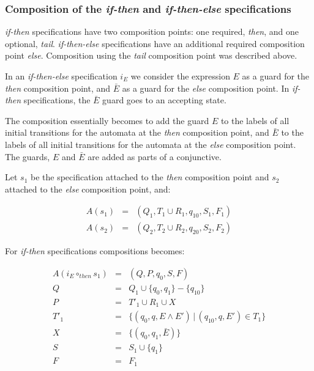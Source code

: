 \subsubsection{Composition of the \textit{if-then} and \textit{if-then-else}
specifications}

\textit{if-then} specifications have two composition points: one required,
\textit{then}, and one optional, \textit{tail}. \textit{if-then-else}
specifications have an additional required composition point \textit{else}.
Composition using the \textit{tail} composition point was described above.

In an \textit{if-then-else} specification $i_E$ we consider the expression $E$
as a guard for the \textit{then} composition point, and $\bar{E}$ as a guard
for the \textit{else} composition point. In \textit{if-then} specifications,
the $\bar{E}$ guard goes to an accepting state.

The composition essentially becomes to add the guard $E$ to the labels of all
initial transitions for the automata at the \textit{then} composition point,
and $\bar{E}$ to the labels of all initial transitions for the automata at the
\textit{else} composition point. The guards, $E$ and $\bar{E}$ are added as
parts of a conjunctive.

Let $s_1$ be the specification attached to the \textit{then} composition point
and $s_2$ attached to the \textit{else} composition point, and:

\medskip
\[
  \begin{array}{rcl}
    A(s_1) & = & (Q_1, T_1 \cup R_1, q_{10}, S_1, F_1) \\
    A(s_2) & = & (Q_2, T_2 \cup R_2, q_{20}, S_2, F_2)
  \end{array}
\]
\medskip

For \textit{if-then} specifications compositions becomes:

\medskip
\[
  \begin{array}{rcl}
  A(i_E \circ_{then} s_1) & = & (Q, P, q_0, S, F) \\
                        Q & = & Q_1 \cup \{q_0, q_1\} - \{q_{10}\} \\
                        P & = & T'_1 \cup R_1 \cup X \\
                     T'_1 & = & \{(q_0, q, E       \wedge E') \, | \, (q_{10}, q, E') \in T_1\} \\
                        X & = & \{(q_0, q_1, \bar{E})\} \\
                        S & = & S_1 \cup \{q_1\} \\
                        F & = & F_1
  \end{array}
\]
\medskip

